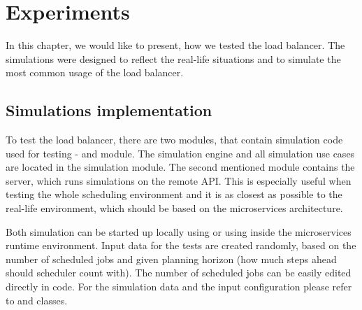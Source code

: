 \chapter{Experiments}\label{ch:experiments}

In this chapter, 
we would like to present,
how we tested the load balancer.
The simulations were designed to reflect the real-life situations 
and to simulate the most common usage of the load balancer.


\section{Simulations implementation}\label{sec:simulations-implementations}
To test the load balancer,
there are two modules, 
that contain simulation code used for testing -
 and  module.
The simulation engine and all simulation use cases are located in the simulation module.
The second mentioned module contains the server, 
which runs simulations on the remote API. 
This is especially useful when testing the whole scheduling environment
and it is as closest as possible to the real-life environment,
which should be based on the microservices architecture.

Both simulation can be started up locally using  or
using  inside the microservices runtime environment.
Input data for the tests are created randomly,
based on the number of scheduled jobs and given planning horizon (how much steps ahead should scheduler count with).
The number of scheduled jobs can be easily edited directly in code.
For the simulation data and the input configuration please refer to  
and  classes.



